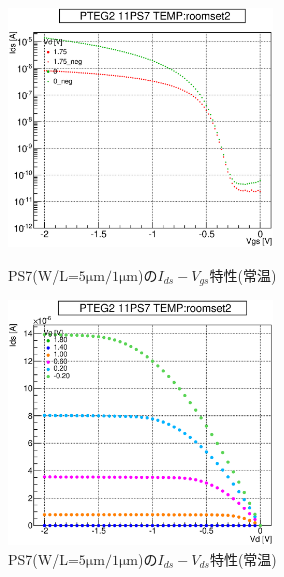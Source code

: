 				\begin{figure}[htbp]
					\begin{minipage}{0.5\hsize}
						\begin{center}
							\includegraphics[width=70mm]{./Chapter/Appendix/Picture/PST/PS7/PTEG2_11_PS7_IdVg_roomset2.eps}
						\end{center}
						\caption{PS7(W/L=$5\mathrm{\mu m}/1\mathrm{\mu m}$)の$I_{ds}-V_{gs}$特性(常温)}
						\label{fig:PS7_IdVg_room}
					\end{minipage}
					\begin{minipage}{0.5\hsize}
						\begin{center}
							\includegraphics[width=70mm]{./Chapter/Appendix/Picture/PST/PS7/PTEG2_11_PS7_IdVd_roomset2.eps}
						\end{center}
						\caption{PS7(W/L=$5\mathrm{\mu m}/1\mathrm{\mu m}$)の$I_{ds}-V_{ds}$特性(常温)}
						\label{fig:PS7_IdVd_room}
					\end{minipage}
				\end{figure}
